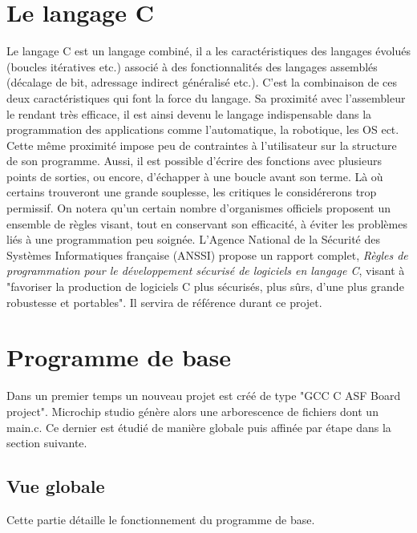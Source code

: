 \documentclass[a4paper]{article}
\begin{document}
\newpage

\section{Le langage C}
Le langage C est un langage combiné, il a les caractéristiques des langages évolués (boucles itératives etc.) associé à des fonctionnalités des langages assemblés (décalage de bit, adressage indirect généralisé etc.). C'est la combinaison de ces deux caractéristiques qui font la force du langage\cite{Monteil2012}. Sa proximité avec l'assembleur le rendant très efficace, il est ainsi devenu le langage indispensable dans la programmation des applications comme l'automatique, la robotique, les OS ect. Cette même proximité impose peu de contraintes à l'utilisateur sur la structure de son programme. Aussi, il est possible d'écrire des fonctions avec plusieurs points de sorties, ou encore, d'échapper à une boucle avant son terme. Là où certains trouveront une grande souplesse, les critiques le considérerons trop permissif. On notera qu'un certain nombre d'organismes officiels proposent un ensemble de règles visant, tout en conservant son efficacité, à éviter les problèmes liés à une programmation peu soignée. L'Agence National de la Sécurité des Systèmes Informatiques française (ANSSI) propose un rapport complet, \textit{Règles de programmation pour le développement sécurisé de logiciels en langage C}\cite{ANSSI2021}, visant à "favoriser la production de logiciels C plus sécurisés, plus sûrs, d’une plus grande robustesse et portables". Il servira de référence durant ce projet.

\newpage

\section{Programme de base} %

Dans un premier temps un nouveau projet est créé de type "GCC C ASF Board project". Microchip studio génère alors une arborescence de fichiers dont un main.c. Ce dernier est étudié de manière globale puis affinée par étape dans la section suivante.

\subsection{Vue globale}
Cette partie détaille le fonctionnement du programme de base. 
\end{document}
